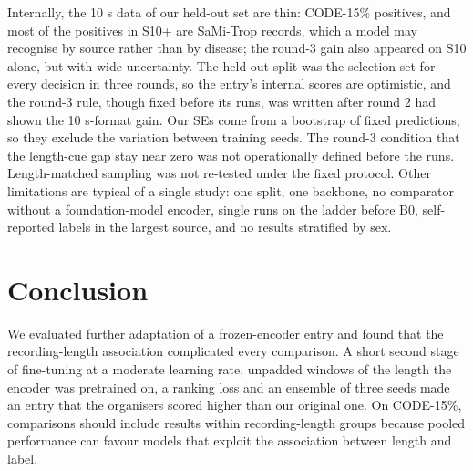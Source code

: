 \documentclass{iopjournal}
\begin{document}
Internally, the 10 s data of our held-out set are thin: \nStenPos{} CODE-15\% positives, and most of the positives in S10+ are SaMi-Trop records, which a model may recognise by source rather than by disease; the round-3 gain also appeared on S10 alone, but with wide uncertainty. The held-out split was the selection set for every decision in three rounds, so the entry's internal scores are optimistic, and the round-3 rule, though fixed before its runs, was written after round 2 had shown the 10 s-format gain. Our SEs come from a bootstrap of fixed predictions, so they exclude the variation between training seeds. The round-3 condition that the length-cue gap stay near zero was not operationally defined before the runs. Length-matched sampling was not re-tested under the fixed protocol. Other limitations are typical of a single study: one split, one backbone, no comparator without a foundation-model encoder, single runs on the ladder before B0, self-reported labels in the largest source, and no results stratified by sex.

\section{Conclusion}
We evaluated further adaptation of a frozen-encoder entry and found that the recording-length association complicated every comparison. A short second stage of fine-tuning at a moderate learning rate, unpadded windows of the length the encoder was pretrained on, a ranking loss and an ensemble of three seeds made an entry that the organisers scored higher than our original one. On CODE-15\%, comparisons should include results within recording-length groups because pooled performance can favour models that exploit the association between length and label.

\end{document}
